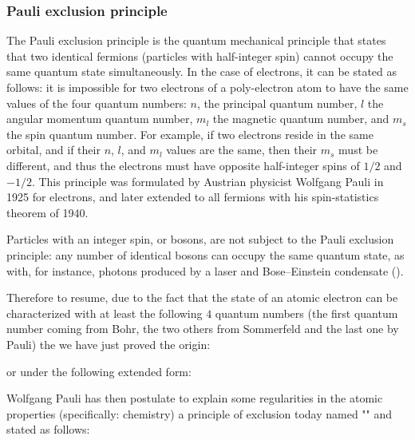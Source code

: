     \pagebreak
    \subsubsection{Pauli exclusion principle}
    The Pauli exclusion principle is the quantum mechanical principle that states that two identical fermions (particles with half-integer spin) cannot occupy the same quantum state simultaneously. In the case of electrons, it can be stated as follows: it is impossible for two electrons of a poly-electron atom to have the same values of the four quantum numbers: $n$, the principal quantum number, $l$ the angular momentum quantum number, $m_l$ the magnetic quantum number, and $m_s$ the spin quantum number. For example, if two electrons reside in the same orbital, and if their $n$, $l$, and $m_l$ values are the same, then their $m_s$ must be different, and thus the electrons must have opposite half-integer spins of $1/2$ and $-1/2$. This principle was formulated by Austrian physicist Wolfgang Pauli in 1925 for electrons, and later extended to all fermions with his spin-statistics theorem of 1940.
    
    Particles with an integer spin, or bosons, are not subject to the Pauli exclusion principle: any number of identical bosons can occupy the same quantum state, as with, for instance, photons produced by a laser and Bose–Einstein condensate ().
    
    Therefore to resume, due to the fact that the state of an atomic electron can be characterized with at least the following $4$ quantum numbers (the first quantum number coming from Bohr, the two others from Sommerfeld and the last one by Pauli) the we have just proved the origin:
	
	or under the following extended form:
	
	Wolfgang Pauli has then postulate to explain some regularities in the atomic properties (specifically: chemistry) a principle of exclusion today named "" and stated as follows:


